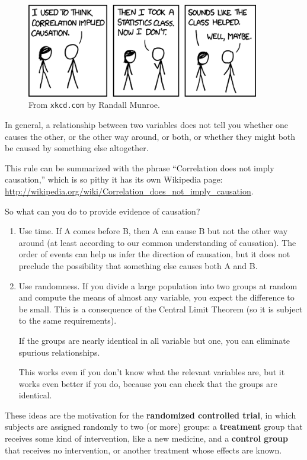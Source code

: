 \documentclass[12pt]{book}
\begin{document}
\begin{figure}
\centerline{\includegraphics[width=4.0in]{figs/correlation.png}}
\caption{From {\tt xkcd.com} by Randall Munroe.}
\end{figure}

In general, a relationship between two variables does not tell you
whether one causes the other, or the other way around, or both, or
whether they might both be caused by something else altogether.

This rule can be summarized with the phrase ``Correlation
does not imply causation,'' which is so pithy it has its own
Wikipedia page: \url{http://wikipedia.org/wiki/Correlation_does_not_imply_causation}.

So what can you do to provide evidence of causation?

\begin{enumerate}

\item Use time.  If A comes before B, then A can cause B but not the
  other way around (at least according to our common understanding of
  causation).  The order of events can help us infer the direction
  of causation, but it does not preclude the possibility that something
  else causes both A and B.

\item Use randomness.  If you divide a large population into two
  groups at random and compute the means of almost any variable, you
  expect the difference to be small.  This is a consequence of the
  Central Limit Theorem (so it is subject to the same requirements).

  If the groups are nearly identical in all variable but one, you
  can eliminate spurious relationships.

  This works even if you don't know what the relevant variables
  are, but it works even better if you do, because you can check that
  the groups are identical.

\end{enumerate}

These ideas are the motivation for the {\bf randomized controlled
trial}, in which subjects are assigned randomly to two (or more)
groups: a {\bf treatment} group that receives some kind of intervention,
like a new medicine, and a {\bf control group} that receives
no intervention, or another treatment whose effects are known.
\end{document}
